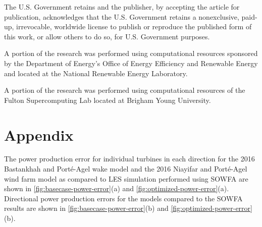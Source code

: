 \documentclass[conf]{new-aiaa}
\begin{document}
The U.S. Government retains and the publisher, by accepting the article for publication, acknowledges that the U.S. Government retains a nonexclusive, paid-up, irrevocable, worldwide license to publish or reproduce the published form of this work, or allow others to do so, for U.S. Government purposes.

A portion of the research was performed using computational resources sponsored by the Department of Energy's Office of Energy Efficiency and Renewable Energy and located at the National Renewable Energy Laboratory. 

A portion of the research was performed using computational resources of the Fulton Supercomputing Lab located at Brigham Young University.

\section*{Appendix}
The power production error for individual turbines in each direction for the 2016 Bastankhah and Port\'{e}-Agel wake model and the 2016 Niayifar and Port\'{e}-Agel wind farm model as compared to LES simulation performed using SOWFA are shown in \cref{fig:basecase-power-error}(a) and \cref{fig:optimized-power-error}(a). Directional power production errors for the models compared to the SOWFA results are shown in \cref{fig:basecase-power-error}(b) and \cref{fig:optimized-power-error}(b).
%
\end{document}
